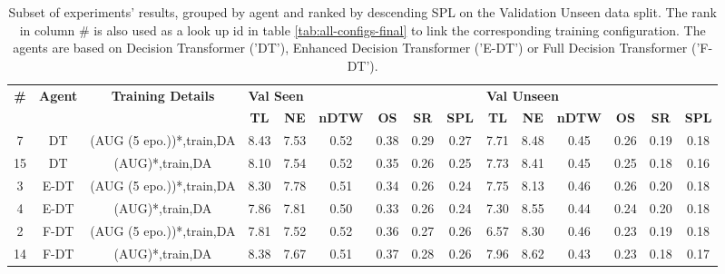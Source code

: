 \begin{table}
\centering
\caption{\label{tab:dagger_envdrop}Subset of experiments' results, grouped by agent and ranked by descending SPL on the Validation Unseen data split. The rank in column \# is also used as a look up id in table \ref{tab:all-configs-final} to link the corresponding training configuration.     \newline The agents are based on Decision Transformer ('DT'), Enhanced Decision Transformer ('E-DT') or Full Decision Transformer ('F-DT').}
\begin{tabular}{@{\hskip3pt}c@{\hskip3pt}c@{\hskip3pt}c@{\hskip3pt}c@{\hskip3pt}c@{\hskip3pt}c@{\hskip3pt}c@{\hskip3pt}c@{\hskip3pt}c@{\hskip3pt}c@{\hskip3pt}c@{\hskip3pt}c@{\hskip3pt}c@{\hskip3pt}c@{\hskip3pt}c}
\toprule
\textbf{\#} & \textbf{Agent} & \textbf{Training Details} & \multicolumn{6}{l}{\textbf{Val Seen}} & \multicolumn{6}{l}{\textbf{Val Unseen}} \\
 \textbf{~} &     \textbf{~} &                \textbf{~} &       \textbf{TL} & \textbf{NE} & \textbf{nDTW} & \textbf{OS} & \textbf{SR} & \textbf{SPL} &         \textbf{TL} & \textbf{NE} & \textbf{nDTW} & \textbf{OS} & \textbf{SR} & \textbf{SPL} \\
\midrule
          7 &             DT &  (AUG (5 epo.))*,train,DA &              8.43 &        7.53 &          0.52 &        0.38 &        0.29 &         0.27 &                7.71 &        8.48 &          0.45 &        0.26 &        0.19 &         0.18 \\
         15 &             DT &           (AUG)*,train,DA &              8.10 &        7.54 &          0.52 &        0.35 &        0.26 &         0.25 &                7.73 &        8.41 &          0.45 &        0.25 &        0.18 &         0.16 \\
          3 &           E-DT &  (AUG (5 epo.))*,train,DA &              8.30 &        7.78 &          0.51 &        0.34 &        0.26 &         0.24 &                7.75 &        8.13 &          0.46 &        0.26 &        0.20 &         0.18 \\
          4 &           E-DT &           (AUG)*,train,DA &              7.86 &        7.81 &          0.50 &        0.33 &        0.26 &         0.24 &                7.30 &        8.55 &          0.44 &        0.24 &        0.20 &         0.18 \\
          2 &           F-DT &  (AUG (5 epo.))*,train,DA &              7.81 &        7.52 &          0.52 &        0.36 &        0.27 &         0.26 &                6.57 &        8.30 &          0.46 &        0.23 &        0.19 &         0.18 \\
         14 &           F-DT &           (AUG)*,train,DA &              8.38 &        7.67 &          0.51 &        0.37 &        0.28 &         0.26 &                7.96 &        8.62 &          0.43 &        0.23 &        0.18 &         0.17 \\
\bottomrule
\end{tabular}
\end{table}
